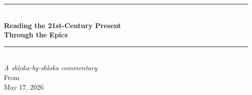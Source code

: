 \begin{center}
\en
\vspace*{3cm}
\rule{\linewidth}{1.2pt}\\[6pt]
{\Huge\bfseries Reading the 21st-Century Present}\\[6pt]
{\Huge\bfseries Through the Epics}\\[6pt]
\rule{\linewidth}{1.2pt}\\[2cm]
{\large\itshape A shloka-by-shloka commentary}\\[1cm]
\vfill
{\normalsize From}\\
{\normalsize May 17, 2026}
\end{center}
\newpage
